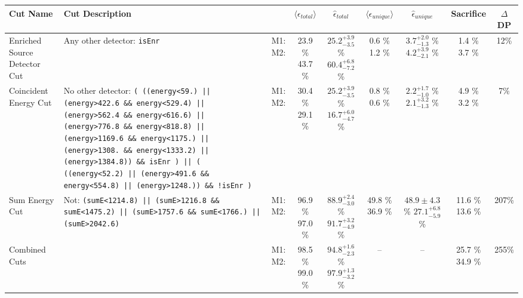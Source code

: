 \small
\begin{tabular}{|>{\raggedright}m{3cm}|m{6cm}|c c c|c c|c|c|}
\hline
  Cut Name & Cut Description &   & $\langle\epsilon_{total}\rangle$ & $\hat{\epsilon}_{total}$ & $\langle\epsilon_{unique}\rangle$ & $\hat{\epsilon}_{unique}$ & Sacrifice & $\Delta$DP \\
\hline
  Enriched Source Detector Cut & \tiny Any other detector: \texttt{isEnr} & \makecell{M1: \\ M2:} & \makecell{23.9 \% \\ 43.7 \%} & \makecell{$25.2^{+3.9}_{-3.5}$ \% \\ $60.4^{+6.8}_{-7.2}$ \%} & \makecell{0.6 \% \\ 1.2 \%} & \makecell{$3.7^{+2.0}_{-1.3}$ \% \\ $4.2^{+3.9}_{-2.1}$ \%} & \makecell{1.4 \% \\ 3.7 \%} & 12\% \\
  Coincident Energy Cut & \tiny No other detector: \texttt{( ((energy<59.) || (energy>422.6 \&\& energy<529.4) || (energy>562.4 \&\& energy<616.6) || (energy>776.8 \&\& energy<818.8) || (energy>1169.6 \&\& energy<1175.) || (energy>1308. \&\& energy<1333.2) || (energy>1384.8)) \&\& isEnr ) || ( ((energy<52.2) || (energy>491.6 \&\& energy<554.8) || (energy>1248.)) \&\& !isEnr )} & \makecell{M1: \\ M2:} & \makecell{30.4 \% \\ 29.1 \%} & \makecell{$25.2^{+3.9}_{-3.5}$ \% \\ $16.7^{+6.0}_{-4.7}$ \%} & \makecell{0.8 \% \\ 0.6 \%} & \makecell{$2.2^{+1.7}_{-1.0}$ \% \\ $2.1^{+3.2}_{-1.3}$ \%} & \makecell{4.9 \% \\ 3.2 \%} & 7\% \\
  Sum Energy Cut & \tiny Not:  \texttt{(sumE<1214.8) || (sumE>1216.8 \&\& sumE<1475.2) || (sumE>1757.6 \&\& sumE<1766.) || (sumE>2042.6)} & \makecell{M1: \\ M2:} & \makecell{96.9 \% \\ 97.0 \%} & \makecell{$88.9^{+2.4}_{-3.0}$ \% \\ $91.7^{+3.2}_{-4.9}$ \%} & \makecell{49.8 \% \\ 36.9 \%} & \makecell{$48.9 \pm 4.3$ \% \\ $27.1^{+6.8}_{-5.9}$ \%} & \makecell{11.6 \% \\ 13.6 \%} & 207\% \\
  Combined Cuts &  & \makecell{M1: \\ M2:} & \makecell{98.5 \% \\ 99.0 \%} & \makecell{$94.8^{+1.6}_{-2.3}$ \% \\ $97.9^{+1.3}_{-3.2}$ \%} & -- & -- & \makecell{25.7 \% \\ 34.9 \%} & 255\% \\
\hline
\end{tabular}
